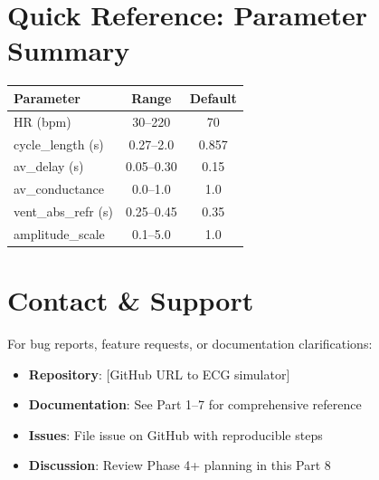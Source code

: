 \documentclass[11pt, a4paper]{article}
\begin{document}
\section{Quick Reference: Parameter Summary}

\begin{tabularx}{\textwidth}{|l|c|c|}
\hline
\textbf{Parameter} & \textbf{Range} & \textbf{Default} \\
\hline
HR (bpm) & 30--220 & 70 \\
cycle\_length (s) & 0.27--2.0 & 0.857 \\
av\_delay (s) & 0.05--0.30 & 0.15 \\
av\_conductance & 0.0--1.0 & 1.0 \\
vent\_abs\_refr (s) & 0.25--0.45 & 0.35 \\
amplitude\_scale & 0.1--5.0 & 1.0 \\
\hline
\end{tabularx}

\section{Contact \& Support}

For bug reports, feature requests, or documentation clarifications:

\begin{itemize}
    \item \textbf{Repository}: [GitHub URL to ECG simulator]
    \item \textbf{Documentation}: See Part 1--7 for comprehensive reference
    \item \textbf{Issues}: File issue on GitHub with reproducible steps
    \item \textbf{Discussion}: Review Phase 4+ planning in this Part 8
\end{itemize}
\end{document}
